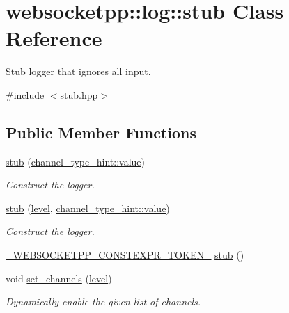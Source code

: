 \hypertarget{classwebsocketpp_1_1log_1_1stub}{}\section{websocketpp\+:\+:log\+:\+:stub Class Reference}
\label{classwebsocketpp_1_1log_1_1stub}


Stub logger that ignores all input.  




{\ttfamily \#include $<$stub.\+hpp$>$}

\subsection*{Public Member Functions}
\begin{DoxyCompactItemize}
\item 
\hyperlink{classwebsocketpp_1_1log_1_1stub_ae28cf7e38cfb64008c4b5b3e90621ad9}{stub} (\hyperlink{structwebsocketpp_1_1log_1_1channel__type__hint_ad12a7f6555b71aabdc4cbec604dc89dd}{channel\+\_\+type\+\_\+hint\+::value})
\begin{DoxyCompactList}\small\item\em Construct the logger. \end{DoxyCompactList}\item 
\hyperlink{classwebsocketpp_1_1log_1_1stub_a45e96ad7f1a562c446645961d8d24784}{stub} (\hyperlink{namespacewebsocketpp_1_1log_a12d4d17939f102db8c9183d400a41960}{level}, \hyperlink{structwebsocketpp_1_1log_1_1channel__type__hint_ad12a7f6555b71aabdc4cbec604dc89dd}{channel\+\_\+type\+\_\+hint\+::value})
\begin{DoxyCompactList}\small\item\em Construct the logger. \end{DoxyCompactList}\item 
\hyperlink{boost__config_8hpp_a3dc3ece336a6149d2fe208a9daf66043}{\+\_\+\+W\+E\+B\+S\+O\+C\+K\+E\+T\+P\+P\+\_\+\+C\+O\+N\+S\+T\+E\+X\+P\+R\+\_\+\+T\+O\+K\+E\+N\+\_\+} \hyperlink{classwebsocketpp_1_1log_1_1stub_aa6ca247e5b1ba83c2c73858c6bf11a01}{stub} ()
\item 
void \hyperlink{classwebsocketpp_1_1log_1_1stub_acdaf1728646e2477cf7243b13f71e18d}{set\+\_\+channels} (\hyperlink{namespacewebsocketpp_1_1log_a12d4d17939f102db8c9183d400a41960}{level})
\begin{DoxyCompactList}\small\item\em Dynamically enable the given list of channels. \end{DoxyCompactList}\item 

\end{DoxyCompactItemize}
